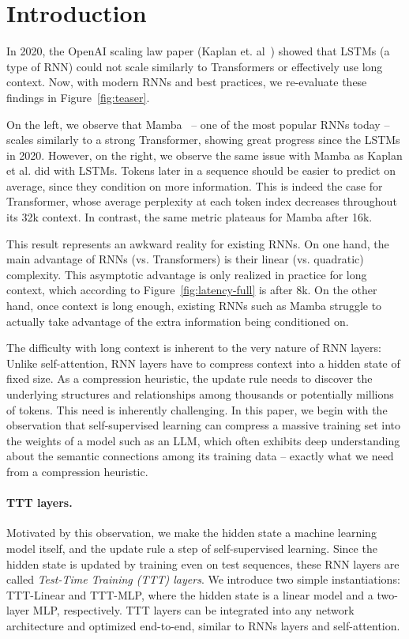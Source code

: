 \documentclass{article}
\begin{document}
\section{Introduction}
\label{intro}
In 2020, the OpenAI scaling law paper (Kaplan et. al~\cite{kaplan2020scaling}) showed that LSTMs (a type of RNN) could not scale similarly to Transformers or effectively use long context.
Now, with modern RNNs and best practices, we re-evaluate these findings in Figure~\ref{fig:teaser}.

On the left, we observe that Mamba~\cite{gu2023mamba}
-- one of the most popular RNNs today -- scales similarly to a strong Transformer, showing great progress since the LSTMs in 2020.
However, on the right, we observe the same issue with Mamba as Kaplan et al. did with LSTMs.
Tokens later in a sequence should be easier to predict on average, since they condition on more information.
This is indeed the case for Transformer, whose average perplexity at each token index decreases throughout its 32k context.
In contrast, the same metric plateaus for Mamba after 16k.

This result represents an awkward reality for existing RNNs.
On one hand, the main advantage of RNNs (vs. Transformers) is their linear (vs. quadratic) complexity. This asymptotic advantage is only realized in practice for long context, which according to Figure~\ref{fig:latency-full} is after 8k.
On the other hand, once context is long enough, existing RNNs such as Mamba struggle to actually take advantage of the extra information being conditioned on.

The difficulty with long context is inherent to the very nature of RNN layers:
Unlike self-attention, RNN layers have to compress context into a hidden state of fixed size.
As a compression heuristic, the update rule needs to discover the underlying structures and relationships among thousands or potentially millions of tokens.
This need is inherently challenging.
In this paper, we begin with the observation that self-supervised learning can compress a massive training set into the weights of a model such as an LLM, which often exhibits deep understanding about the semantic connections among its training data -- exactly what we need from a compression heuristic.

\paragraph{TTT layers.} Motivated by this observation, we make the hidden state a machine learning model itself, and the update rule a step of self-supervised learning.
Since the hidden state is updated by training even on test sequences, these RNN layers are called \emph{Test-Time Training (TTT) layers}.
We introduce two simple instantiations: TTT-Linear and TTT-MLP, where the hidden state is a linear model and a two-layer MLP, respectively. 
TTT layers can be integrated into any network architecture and optimized end-to-end, similar to RNNs layers and self-attention.
\end{document}
